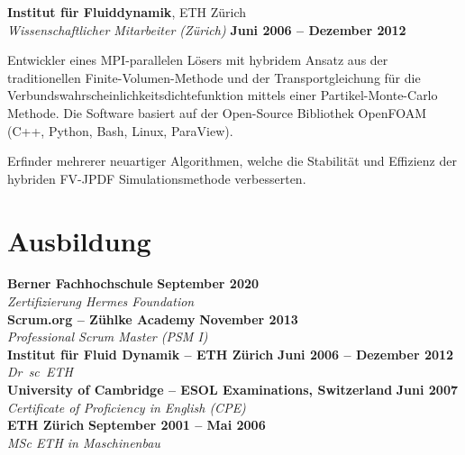 \documentclass[line,11pt,a4paper]{resume}
\begin{document}
\begin{resume}
\textbf{Institut für Fluiddynamik}, ETH Zürich\\\vspace{1mm}%
\textsl{Wissenschaftlicher Mitarbeiter (Zürich)}
  \hfill \textbf{Juni 2006 -- Dezember 2012}\\
\vspace{-4mm}%
\begin{list2}
  \item Entwickler eines MPI-parallelen Lösers mit hybridem Ansatz aus
    der traditionellen Finite-Volumen-Methode und der Transportgleichung für
    die Verbundswahrscheinlichkeitsdichtefunktion mittels einer
    Partikel-Monte-Carlo Methode. Die Software basiert auf der Open-Source
    Bibliothek OpenFOAM (C++, Python, Bash, Linux, ParaView).

  \item Erfinder mehrerer neuartiger Algorithmen, welche die Stabilität und
    Effizienz der hybriden FV-JPDF Simulationsmethode verbesserten.
\end{list2}

\section{\mysidestyle Ausbildung}\vspace{2mm}

\textbf{Berner Fachhochschule} \hfill \textbf{September 2020}\\
\vspace{1mm}%
\textsl{Zertifizierung Hermes Foundation}\\
\vspace{-1mm}%
%
\textbf{Scrum.org -- Zühlke Academy} \hfill \textbf{November 2013}\\
\vspace{1mm}%
\textsl{Professional Scrum Master (PSM I)}\\
\vspace{-1mm}%
%
\textbf{Institut für Fluid Dynamik -- ETH Zürich}
  \hfill \textbf{Juni 2006 -- Dezember 2012}\\
\vspace{1mm}%
\textsl{Dr\ sc\ ETH}\\
\vspace{-1mm}%
%
\textbf{University of Cambridge -- ESOL Examinations, Switzerland}
  \hfill \textbf{Juni 2007}\\
\vspace{1mm}%
\textsl{Certificate of Proficiency in English (CPE)}\\
\vspace{-1mm}%
%
\textbf{ETH Zürich} \hfill \textbf{September 2001 -- Mai 2006}\\
\vspace{1mm}%
\textsl{MSc ETH in Maschinenbau}


\end{resume}
\end{document}
